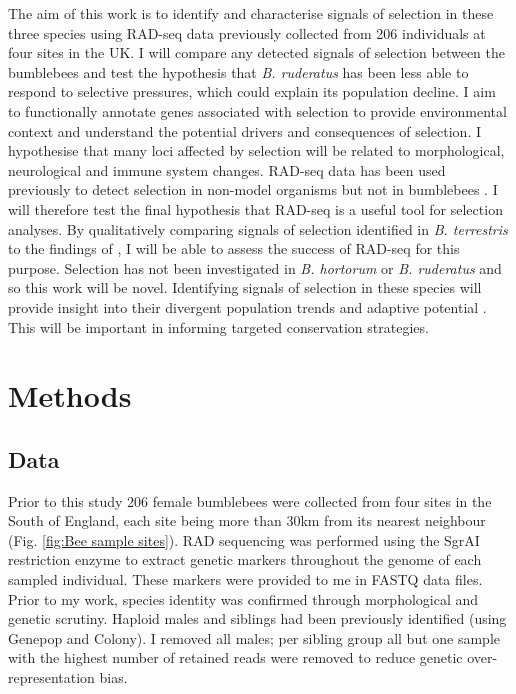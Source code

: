 \documentclass[12pt]{article}
\begin{document}
\begin{linenumbers}
	The aim of this work is to identify and characterise signals of selection in these three species using RAD-seq data previously collected from 206 individuals at four sites in the UK. 
	I will compare any detected signals of selection between the bumblebees and test the hypothesis that \emph{B. ruderatus} has been less able to respond to selective pressures, which could explain its population decline.
	I aim to functionally annotate genes associated with selection to provide environmental context and understand the potential drivers and consequences of selection. I hypothesise that many loci affected by selection will be related to morphological, neurological and immune system changes. 
	RAD-seq data has been used previously to detect selection in non-model organisms but not in bumblebees \citep[e.g.][]{blanco-bercial_new_2016, kang_population_2017, leiva_population_2019, de_jong_detecting_2021}. I will therefore test the final hypothesis that RAD-seq is a useful tool for selection analyses. By qualitatively comparing signals of selection identified in \emph{B. terrestris} to the findings of \cite{colgan_genomic_2022}, I will be able to assess the success of RAD-seq for this purpose. Selection has not been investigated in \emph{B. hortorum} or \emph{B. ruderatus} and so this work will be novel.
	Identifying signals of selection in these species will provide insight into their divergent population trends and adaptive potential \citep{woodard_molecular_2015, powney_widespread_2019}. This will be important in informing targeted conservation strategies. 


    \section{Methods}
    
    
    	\subsection{Data}

    	Prior to this study 206 female bumblebees were collected from four sites in the South of England, each site being more than 30km from its nearest neighbour (Fig. \ref{fig:Bee sample sites}). RAD sequencing was performed using the SgrAI restriction enzyme to extract genetic markers throughout the genome of each sampled individual. These markers were provided to me in FASTQ data files. Prior to my work, species identity was confirmed through morphological and genetic scrutiny. Haploid males and siblings had been previously identified (using Genepop and Colony). I removed all males; per sibling group all but one sample with the highest number of retained reads were removed to reduce genetic over-representation bias.
    	

\end{linenumbers}
\end{document}
